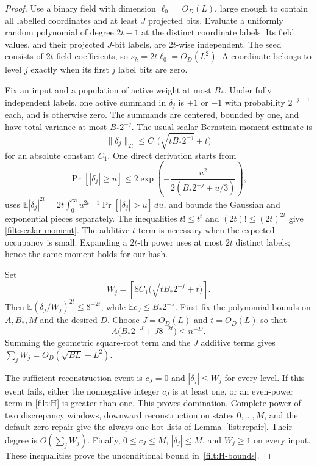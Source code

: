 \documentclass[11pt,letterpaper]{article}
\theoremstyle{definition}
\theoremstyle{remark}
\begin{document}
\begin{proof}
Use a binary field with dimension $\ell_0=O_D(L)$, large enough to
contain all labelled coordinates and at least $J$ projected bits.
Evaluate a uniformly random polynomial of degree $2t-1$ at the distinct
coordinate labels.  Its field values, and their projected $J$-bit
labels, are $2t$-wise independent.  The seed consists of $2t$ field
coefficients, so $s_h=2t\ell_0=O_D(L^2)$.  A coordinate belongs to level
$j$ exactly when its first $j$ label bits are zero.

Fix an input and a population of active weight at most $B_*$.
Under fully independent labels, one active summand in $\delta_j$ is
$+1$ or $-1$ with probability $2^{-j-1}$ each, and is otherwise zero.
The summands are centered, bounded by one, and have total variance at
most $B_*2^{-j}$.  The usual scalar Bernstein moment estimate is
\begin{equation}\label{filt:scalar-moment}
 \|\delta_j\|_{2t}\le C_1\bigl(\sqrt{tB_*2^{-j}}+t\bigr)
\end{equation}
for an absolute constant $C_1$.  One direct derivation starts from
\[
 \Pr[|\delta_j|\ge u]
 \le 2\exp\left(-\frac{u^2}{2(B_*2^{-j}+u/3)}\right),
\]
uses $\mathbb E|\delta_j|^{2t}=2t\int_0^\infty
u^{2t-1}\Pr[|\delta_j|>u]\,du$, and bounds the Gaussian and
exponential pieces separately.  The inequalities
$t!\le t^t$ and $(2t)!\le(2t)^{2t}$ give
\eqref{filt:scalar-moment}.  The additive $t$ term is necessary when
the expected occupancy is small.  Expanding a $2t$-th power uses at
most $2t$ distinct labels; hence the same moment holds for our hash.

Set
\[
 W_j=\left\lceil 8C_1\bigl(\sqrt{tB_*2^{-j}}+t\bigr)\right\rceil.
\]
Then $\mathbb E(\delta_j/W_j)^{2t}\le8^{-2t}$, while
$\mathbb E c_J\le B_*2^{-J}$.  First fix the polynomial bounds on
$A,B_*,M$ and the desired $D$.  Choose $J=O_D(L)$ and $t=O_D(L)$
so that
\[
 A\bigl(B_*2^{-J}+J8^{-2t}\bigr)\le n^{-D}.
\]
Summing the geometric square-root term and the $J$ additive terms
gives $\sum_jW_j=O_D(\sqrt{BL}+L^2)$.

The sufficient reconstruction event is $c_J=0$ and
$|\delta_j|\le W_j$ for every level.  If this event fails, either the
nonnegative integer $c_J$ is at least one, or an even-power term in
\eqref{filt:H} is greater than one.  This proves domination.  Complete
power-of-two discrepancy windows, downward reconstruction on states
$0,\ldots,M$, and the default-zero repair give the always-one-hot
lists of Lemma~\ref{list:repair}.  Their degree is
$O(\sum_jW_j)$.  Finally, $0\le c_J\le M$,
$|\delta_j|\le M$, and $W_j\ge1$ on every input.  These inequalities
prove the unconditional bound in~\eqref{filt:H-bounds}.
\end{proof}
\end{document}

